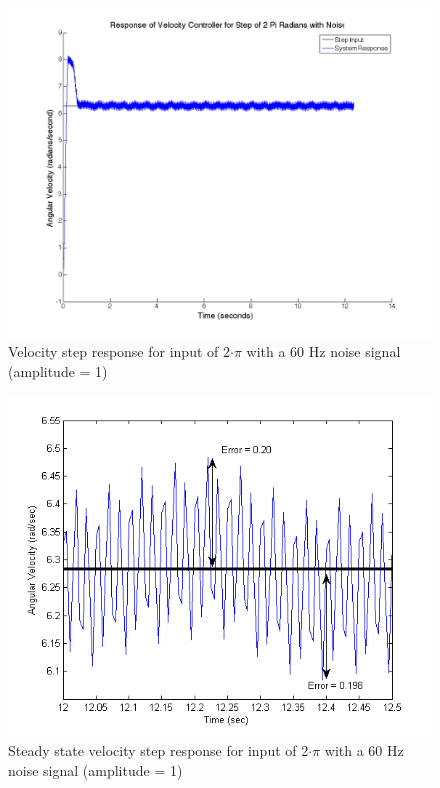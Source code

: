 \documentclass{article}
\theoremstyle{plain}
\theoremstyle{definition}
\theoremstyle{remark}
\begin{document}
\begin{figure}
\begin{center}
\includegraphics[width = 12cm]{velstep2PiwNoise.png}
\caption{Velocity step response for input of 2$\cdot\pi$ with a 60 Hz noise signal (amplitude = 1)}
\label{q6_7}
\end{center}
\end{figure}

\begin{figure}
\begin{center}
\includegraphics[width = 12cm]{VelErrorNoise.png}
\caption{Steady state velocity step response for input of 2$\cdot\pi$ with a 60 Hz noise signal (amplitude = 1)}
\label{VelNoiseZoom}
\end{center}
\end{figure}
\end{document}
